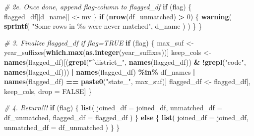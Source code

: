 \documentclass[
]{article}
\newenvironment{Shaded}{\begin{snugshade}}{\end{snugshade}}
\newcommand{\AttributeTok}[1]{\textcolor[rgb]{0.13,0.29,0.53}{#1}}
\newcommand{\CommentTok}[1]{\textcolor[rgb]{0.56,0.35,0.01}{\textit{#1}}}
\newcommand{\ConstantTok}[1]{\textcolor[rgb]{0.56,0.35,0.01}{#1}}
\newcommand{\ControlFlowTok}[1]{\textcolor[rgb]{0.13,0.29,0.53}{\textbf{#1}}}
\newcommand{\DecValTok}[1]{\textcolor[rgb]{0.00,0.00,0.81}{#1}}
\newcommand{\FunctionTok}[1]{\textcolor[rgb]{0.13,0.29,0.53}{\textbf{#1}}}
\newcommand{\NormalTok}[1]{#1}
\newcommand{\OtherTok}[1]{\textcolor[rgb]{0.56,0.35,0.01}{#1}}
\newcommand{\SpecialCharTok}[1]{\textcolor[rgb]{0.81,0.36,0.00}{\textbf{#1}}}
\newcommand{\StringTok}[1]{\textcolor[rgb]{0.31,0.60,0.02}{#1}}
\begin{document}
\begin{Shaded}
\begin{Highlighting}[]
        \CommentTok{\# 2e. Once done, append flag{-}column to flagged\_df}
        \ControlFlowTok{if}\NormalTok{ (flag) \{}
\NormalTok{            flagged\_df[[d\_name]] }\OtherTok{\textless{}{-}}\NormalTok{ mv}
\NormalTok{        \}}
        \ControlFlowTok{if}\NormalTok{ (}\FunctionTok{nrow}\NormalTok{(df\_unmatched) }\SpecialCharTok{\textgreater{}}
            \DecValTok{0}\NormalTok{) \{}
            \FunctionTok{warning}\NormalTok{(}
                \FunctionTok{sprintf}\NormalTok{(}
                  \StringTok{"Some rows in \%s were never matched"}\NormalTok{,}
\NormalTok{                  d\_name}
\NormalTok{              )}
\NormalTok{            )}
\NormalTok{        \}}
\NormalTok{    \}}

    \CommentTok{\# 3. Finalize flagged\_df if flag=TRUE}
    \ControlFlowTok{if}\NormalTok{ (flag) \{}
\NormalTok{        max\_suf }\OtherTok{\textless{}{-}}\NormalTok{ year\_suffixes[}\FunctionTok{which.max}\NormalTok{(}\FunctionTok{as.integer}\NormalTok{(year\_suffixes))]}
\NormalTok{        keep\_cols }\OtherTok{\textless{}{-}} \FunctionTok{names}\NormalTok{(flagged\_df)[(}\FunctionTok{grepl}\NormalTok{(}\StringTok{"\^{}district\_"}\NormalTok{, }\FunctionTok{names}\NormalTok{(flagged\_df)) }\SpecialCharTok{\&}
            \SpecialCharTok{!}\FunctionTok{grepl}\NormalTok{(}\StringTok{"code"}\NormalTok{, }\FunctionTok{names}\NormalTok{(flagged\_df))) }\SpecialCharTok{|}
            \FunctionTok{names}\NormalTok{(flagged\_df) }\SpecialCharTok{\%in\%}
\NormalTok{                df\_names }\SpecialCharTok{|} \FunctionTok{names}\NormalTok{(flagged\_df) }\SpecialCharTok{==}
            \FunctionTok{paste0}\NormalTok{(}\StringTok{"state\_"}\NormalTok{, max\_suf)]}
\NormalTok{        flagged\_df }\OtherTok{\textless{}{-}}\NormalTok{ flagged\_df[,}
\NormalTok{            keep\_cols, drop }\OtherTok{=} \ConstantTok{FALSE}\NormalTok{]}
\NormalTok{    \}}

    \CommentTok{\# 4. Return!!!}
    \ControlFlowTok{if}\NormalTok{ (flag) \{}
        \FunctionTok{list}\NormalTok{(}
            \AttributeTok{joined\_df =}\NormalTok{ joined\_df,}
            \AttributeTok{unmatched\_df =}\NormalTok{ df\_unmatched,}
            \AttributeTok{flagged\_df =}\NormalTok{ flagged\_df}
\NormalTok{        )}
\NormalTok{    \} }\ControlFlowTok{else}\NormalTok{ \{}
        \FunctionTok{list}\NormalTok{(}
            \AttributeTok{joined\_df =}\NormalTok{ joined\_df,}
            \AttributeTok{unmatched\_df =}\NormalTok{ df\_unmatched}
\NormalTok{        )}
\NormalTok{    \}}
\NormalTok{\}}
\end{Highlighting}
\end{Shaded}
\end{document}
